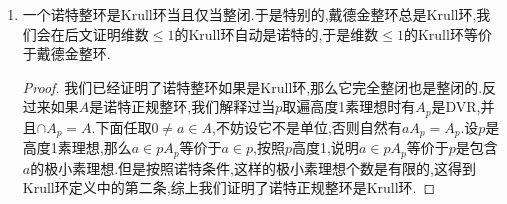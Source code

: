\begin{enumerate}
\begin{proof}
    	不妨设$K'$本身是$A\cap K'$的商域,否则可以用$\mathrm{Frac}(A\cap K')$替换$K'$,这不改变$A\cap K'$.设用来定义$A$的DVR族为$\{R_{\lambda},\lambda\in\Lambda\}$.那么有$A\cap K'\subseteq R_{\lambda}\cap K'\subseteq K'$.一般的,如果$A$是商域为$K$的DVR,如果环$R$满足$A\subseteq R\subseteq K$,那么$R$要么是DVR,要么有$R=K$(比方说,设$\pi$是素元,设使得$\varepsilon/\pi^r\in R$的最大的自然数为$r$,其中$\varepsilon\in A$是单位,如果$r=0$则$R=K$,如果$r>0$那么$1/\pi^r\in R$是$R$的素元,使得$R$是DVR).所以如果记$\Lambda'\subseteq\Lambda$是使得$R_{\lambda}\cap K'\not=K'$的指标$\lambda$,则有$\cap_{\lambda\in\Lambda'}R_{\lambda}=A$,并且有$R_{\lambda}\cap K'$是DVR,并且有$\cap_{\lambda\in\Lambda'}(R_{\lambda}\cap K')=A\cap K'$.于是$A\cap K'$是Krull环.
    \end{proof}
    \item 一个诺特整环是Krull环当且仅当整闭.于是特别的,戴德金整环总是Krull环,我们会在后文证明维数$\le1$的Krull环自动是诺特的,于是维数$\le1$的Krull环等价于戴德金整环.
    \begin{proof}
    	
    	我们已经证明了诺特整环如果是Krull环,那么它完全整闭也是整闭的.反过来如果$A$是诺特正规整环,我们解释过当$p$取遍高度1素理想时有$A_p$是DVR,并且$\cap A_p=A$.下面任取$0\not=a\in A$,不妨设它不是单位,否则自然有$aA_p=A_p$.设$p$是高度1素理想,那么$a\in pA_p$等价于$a\in p$,按照$p$高度1,说明$a\in pA_p$等价于$p$是包含$a$的极小素理想.但是按照诺特条件,这样的极小素理想个数是有限的,这得到Krull环定义中的第二条,综上我们证明了诺特正规整环是Krull环.
    \end{proof}
\end{enumerate}

